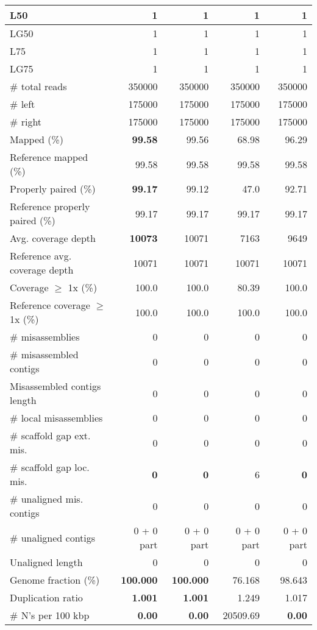 \documentclass[12pt,a4paper]{article}
\begin{document}
\begin{table}[ht]
\begin{center}
\begin{tabular}{|l*{4}{|r}|}
L50 & 1 & 1 & 1 & 1 \\ \hline
LG50 & 1 & 1 & 1 & 1 \\ \hline
L75 & 1 & 1 & 1 & 1 \\ \hline
LG75 & 1 & 1 & 1 & 1 \\ \hline
\# total reads & 350000 & 350000 & 350000 & 350000 \\ \hline
\# left & 175000 & 175000 & 175000 & 175000 \\ \hline
\# right & 175000 & 175000 & 175000 & 175000 \\ \hline
Mapped (\%) & {\bf 99.58} & 99.56 & 68.98 & 96.29 \\ \hline
Reference mapped (\%) & 99.58 & 99.58 & 99.58 & 99.58 \\ \hline
Properly paired (\%) & {\bf 99.17} & 99.12 & 47.0 & 92.71 \\ \hline
Reference properly paired (\%) & 99.17 & 99.17 & 99.17 & 99.17 \\ \hline
Avg. coverage depth & {\bf 10073} & 10071 & 7163 & 9649 \\ \hline
Reference avg. coverage depth & 10071 & 10071 & 10071 & 10071 \\ \hline
Coverage $\geq$ 1x (\%) & 100.0 & 100.0 & 80.39 & 100.0 \\ \hline
Reference coverage $\geq$ 1x (\%) & 100.0 & 100.0 & 100.0 & 100.0 \\ \hline
\# misassemblies & 0 & 0 & 0 & 0 \\ \hline
\# misassembled contigs & 0 & 0 & 0 & 0 \\ \hline
Misassembled contigs length & 0 & 0 & 0 & 0 \\ \hline
\# local misassemblies & 0 & 0 & 0 & 0 \\ \hline
\# scaffold gap ext. mis. & 0 & 0 & 0 & 0 \\ \hline
\# scaffold gap loc. mis. & {\bf 0} & {\bf 0} & 6 & {\bf 0} \\ \hline
\# unaligned mis. contigs & 0 & 0 & 0 & 0 \\ \hline
\# unaligned contigs & 0 + 0 part & 0 + 0 part & 0 + 0 part & 0 + 0 part \\ \hline
Unaligned length & 0 & 0 & 0 & 0 \\ \hline
Genome fraction (\%) & {\bf 100.000} & {\bf 100.000} & 76.168 & 98.643 \\ \hline
Duplication ratio & {\bf 1.001} & {\bf 1.001} & 1.249 & 1.017 \\ \hline
\# N's per 100 kbp & {\bf 0.00} & {\bf 0.00} & 20509.69 & {\bf 0.00} \\ \hline

\end{tabular}
\end{center}
\end{table}
\end{document}

